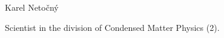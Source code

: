 \begin{participant}[type=leadPI,PM=24,gender=male,salary=5500]{Karel Netočný}

Scientist in the division of Condensed Matter Physics (2).

\end{participant}

